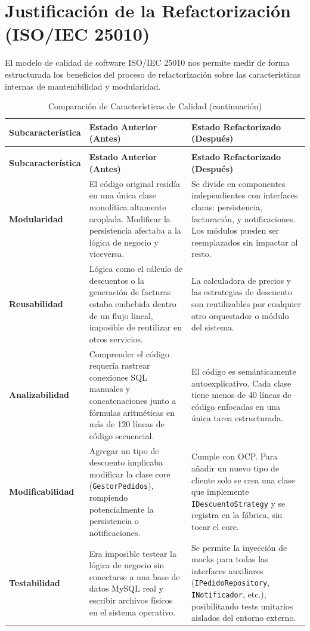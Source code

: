 \documentclass[12pt, a4paper]{article}
\begin{document}
\section{Justificación de la Refactorización (ISO/IEC 25010)}
El modelo de calidad de software ISO/IEC 25010 nos permite medir de forma estructurada los beneficios del proceso de refactorización sobre las características internas de mantenibilidad y modularidad.

\begin{longtable}{p{3.0cm} p{6.0cm} p{6.0cm}}
\caption{Comparación de Características de Calidad (Antes vs. Después)} \label{tab:iso25010} \\
\toprule
\textbf{Subcaracterística} & \textbf{Estado Anterior (Antes)} & \textbf{Estado Refactorizado (Después)} \\
\midrule
\endfirsthead
\caption[]{Comparación de Características de Calidad (continuación)} \\
\toprule
\textbf{Subcaracterística} & \textbf{Estado Anterior (Antes)} & \textbf{Estado Refactorizado (Después)} \\
\midrule
\endhead
\bottomrule
\endfoot

\textbf{Modularidad} & El código original residía en una única clase monolítica altamente acoplada. Modificar la persistencia afectaba a la lógica de negocio y viceversa. & Se divide en componentes independientes con interfaces claras: persistencia, facturación, y notificaciones. Los módulos pueden ser reemplazados sin impactar al resto. \\
\midrule

\textbf{Reusabilidad} & Lógica como el cálculo de descuentos o la generación de facturas estaba embebida dentro de un flujo lineal, imposible de reutilizar en otros servicios. & La calculadora de precios y las estrategias de descuento son reutilizables por cualquier otro orquestador o módulo del sistema. \\
\midrule

\textbf{Analizabilidad} & Comprender el código requería rastrear conexiones SQL manuales y concatenaciones junto a fórmulas aritméticas en más de 120 líneas de código secuencial. & El código es semánticamente autoexplicativo. Cada clase tiene menos de 40 líneas de código enfocadas en una única tarea estructurada. \\
\midrule

\textbf{Modificabilidad} & Agregar un tipo de descuento implicaba modificar la clase core (\texttt{GestorPedidos}), rompiendo potencialmente la persistencia o notificaciones. & Cumple con OCP. Para añadir un nuevo tipo de cliente solo se crea una clase que implemente \texttt{IDescuentoStrategy} y se registra en la fábrica, sin tocar el core. \\
\midrule

\textbf{Testabilidad} & Era imposible testear la lógica de negocio sin conectarse a una base de datos MySQL real y escribir archivos físicos en el sistema operativo. & Se permite la inyección de mocks para todas las interfaces auxiliares (\texttt{IPedidoRepository}, \texttt{INotificador}, etc.), posibilitando tests unitarios aislados del entorno externo. \\
\bottomrule
\end{longtable}
\end{document}
